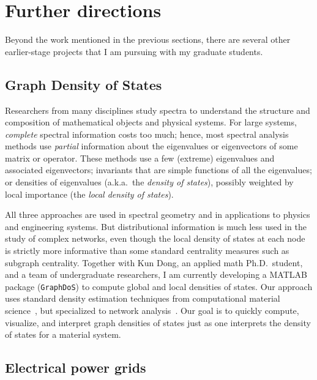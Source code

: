 \documentclass[11pt]{amsart}
\begin{document}
\section{Further directions}
\label{sec-directions}

Beyond the work mentioned in the previous sections, there are
several other earlier-stage projects that I am pursuing with my
graduate students.

\subsection*{Graph Density of States}

Researchers from many disciplines study spectra to understand the
structure and composition of mathematical objects and physical systems.
For large systems, {\em complete} spectral information costs too much;
hence, most spectral analysis methods use {\em partial} information
about the eigenvalues or eigenvectors of some matrix or operator.
These methods use a few (extreme) eigenvalues and
associated eigenvectors; invariants that are simple functions of all the
eigenvalues; or densities of eigenvalues (a.k.a.~the {\em density of states}),
possibly weighted by local importance (the {\em local density of states}).

All three approaches are used in spectral geometry and in applications to
physics and engineering systems.  But distributional information is much
less used in the study of complex networks, even though the local
density of states at each node is strictly more informative than
some standard centrality measures such as subgraph centrality.
Together with Kun Dong, an applied math Ph.D.~student, and a team of
undergraduate researchers, I am currently developing a MATLAB package
({\tt GraphDoS}) to compute global and local densities of states.
Our approach uses standard density estimation techniques from
computational material science~\cite{Lin:2016:Approximating,Weisse:2006:The-kernel},
but specialized to network analysis~\cite{2015-siam-ns}.  Our
goal is to quickly compute, visualize, and
interpret graph densities of states just
as one interprets the density of states for a material system.

\subsection*{Electrical power grids}

\end{document}
